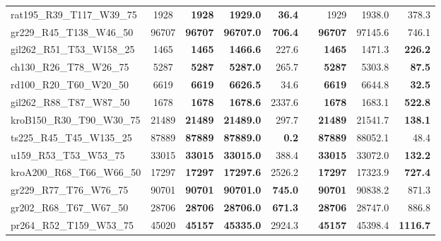 \documentclass{singlecol-new}
\theoremstyle{TH}{
\newtheorem{lemma}{Lemma}
\newtheorem{theorem}[lemma]{Theorem}
\newtheorem{corrolary}[lemma]{Corrolary}
\newtheorem{conjecture}[lemma]{Conjecture}
\newtheorem{proposition}[lemma]{Proposition}
\newtheorem{claim}[lemma]{Claim}
\newtheorem{stheorem}[lemma]{Wrong Theorem}
}
\theoremstyle{THrm}{
\newtheorem{definition}{Definition}[section]
\newtheorem{question}{Question}[section]
\newtheorem{remark}{Remark}
\newtheorem{scheme}{Scheme}
}
\theoremstyle{THhit}{
\newtheorem{case}{Case}[section]
}
\begin{document}
\begin{table}[]
{\begin{tabular}{lcrrrrrrr}
		rat195\_R39\_T117\_W39\_75 & 1928                 & \textbf{1928}   & \textbf{1929.0}   & \textbf{36.4}   &  & 1929            & 1938.0           & 378.3           \\
		gr229\_R45\_T138\_W46\_50  & 96707                & \textbf{96707}  & \textbf{96707.0}  & \textbf{706.4}  &  & \textbf{96707}  & 97145.6          & 746.1           \\
		gil262\_R51\_T53\_W158\_25 & 1465                 & \textbf{1465}   & \textbf{1466.6}   & 227.6           &  & \textbf{1465}   & 1471.3           & \textbf{226.2}  \\
		ch130\_R26\_T78\_W26\_75   & 5287                 & \textbf{5287}   & \textbf{5287.0}   & 265.7           &  & \textbf{5287}   & 5303.8           & \textbf{87.5}   \\
		rd100\_R20\_T60\_W20\_50   & 6619                 & \textbf{6619}   & \textbf{6626.5}   & 34.6            &  & \textbf{6619}   & 6644.8           & \textbf{32.5}   \\
		gil262\_R88\_T87\_W87\_50  & 1678                 & \textbf{1678}   & \textbf{1678.6}   & 2337.6          &  & \textbf{1678}   & 1683.1           & \textbf{522.8}  \\
		kroB150\_R30\_T90\_W30\_75 & 21489                & \textbf{21489}  & \textbf{21489.0}  & 297.7           &  & \textbf{21489}  & 21541.7          & \textbf{138.1}  \\
		ts225\_R45\_T45\_W135\_25  & 87889                & \textbf{87889}  & \textbf{87889.0}  & \textbf{0.2}    &  & \textbf{87889}  & 88052.1          & 48.4            \\
		u159\_R53\_T53\_W53\_75    & 33015                & \textbf{33015}  & \textbf{33015.0}  & 388.4           &  & \textbf{33015}  & 33072.0          & \textbf{132.2}  \\
		kroA200\_R68\_T66\_W66\_50 & 17297                & \textbf{17297}  & \textbf{17297.6}  & 2526.2          &  & \textbf{17297}  & 17323.9          & \textbf{727.4}  \\
		gr229\_R77\_T76\_W76\_75   & 90701                & \textbf{90701}  & \textbf{90701.0}  & \textbf{745.0}  &  & \textbf{90701}  & 90838.2          & 871.3           \\
		gr202\_R68\_T67\_W67\_50   & 28706                & \textbf{28706}  & \textbf{28706.0}  & \textbf{671.3}  &  & \textbf{28706}  & 28747.0          & 886.8           \\
		pr264\_R52\_T159\_W53\_75  & 45020                & \textbf{45157}  & \textbf{45335.0}  & 2924.3          &  & \textbf{45157}  & 45398.4          & \textbf{1116.7} \\

\end{tabular}}
\end{table}
\end{document}
